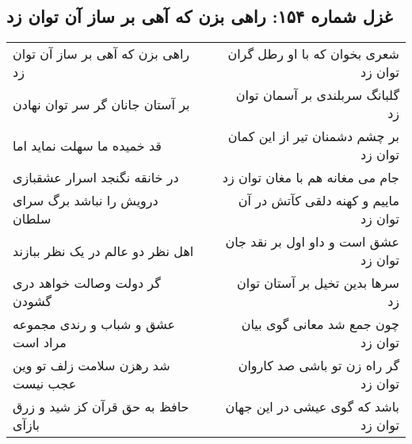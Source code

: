 \begin{center}
\section*{غزل شماره ۱۵۴: راهی بزن که آهی بر ساز آن توان زد}
\label{sec:sh154}
\begin{longtable}{l p{0.5cm} r}
راهی بزن که آهی بر ساز آن توان زد
&&
شعری بخوان که با او رطل گران توان زد
\\
بر آستان جانان گر سر توان نهادن
&&
گلبانگ سربلندی بر آسمان توان زد
\\
قد خمیده ما سهلت نماید اما
&&
بر چشم دشمنان تیر از این کمان توان زد
\\
در خانقه نگنجد اسرار عشقبازی
&&
جام می مغانه هم با مغان توان زد
\\
درویش را نباشد برگ سرای سلطان
&&
ماییم و کهنه دلقی کآتش در آن توان زد
\\
اهل نظر دو عالم در یک نظر ببازند
&&
عشق است و داو اول بر نقد جان توان زد
\\
گر دولت وصالت خواهد دری گشودن
&&
سرها بدین تخیل بر آستان توان زد
\\
عشق و شباب و رندی مجموعه مراد است
&&
چون جمع شد معانی گوی بیان توان زد
\\
شد رهزن سلامت زلف تو وین عجب نیست
&&
گر راه زن تو باشی صد کاروان توان زد
\\
حافظ به حق قرآن کز شید و زرق بازآی
&&
باشد که گوی عیشی در این جهان توان زد
\\
\end{longtable}
\end{center}
